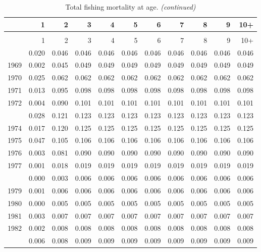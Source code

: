 \documentclass[
]{article}
\begin{document}
\begin{longtable}[t]{lrrrrrrrrrr}
\caption{\label{tab:FAA-tot-table}Total fishing mortality at age.}\\
\toprule
  & 1 & 2 & 3 & 4 & 5 & 6 & 7 & 8 & 9 & 10+\\
\midrule
\endfirsthead
\caption[]{Total fishing mortality at age. \textit{(continued)}}\\
\toprule
  & 1 & 2 & 3 & 4 & 5 & 6 & 7 & 8 & 9 & 10+\\
\midrule
\endhead

\endfoot
\bottomrule
\endlastfoot
1968 & 0.020 & 0.046 & 0.046 & 0.046 & 0.046 & 0.046 & 0.046 & 0.046 & 0.046 & 0.046\\
1969 & 0.002 & 0.045 & 0.049 & 0.049 & 0.049 & 0.049 & 0.049 & 0.049 & 0.049 & 0.049\\
1970 & 0.025 & 0.062 & 0.062 & 0.062 & 0.062 & 0.062 & 0.062 & 0.062 & 0.062 & 0.062\\
1971 & 0.013 & 0.095 & 0.098 & 0.098 & 0.098 & 0.098 & 0.098 & 0.098 & 0.098 & 0.098\\
1972 & 0.004 & 0.090 & 0.101 & 0.101 & 0.101 & 0.101 & 0.101 & 0.101 & 0.101 & 0.101\\
\addlinespace
1973 & 0.028 & 0.121 & 0.123 & 0.123 & 0.123 & 0.123 & 0.123 & 0.123 & 0.123 & 0.123\\
1974 & 0.017 & 0.120 & 0.125 & 0.125 & 0.125 & 0.125 & 0.125 & 0.125 & 0.125 & 0.125\\
1975 & 0.047 & 0.105 & 0.106 & 0.106 & 0.106 & 0.106 & 0.106 & 0.106 & 0.106 & 0.106\\
1976 & 0.003 & 0.081 & 0.090 & 0.090 & 0.090 & 0.090 & 0.090 & 0.090 & 0.090 & 0.090\\
1977 & 0.001 & 0.018 & 0.019 & 0.019 & 0.019 & 0.019 & 0.019 & 0.019 & 0.019 & 0.019\\
\addlinespace
1978 & 0.000 & 0.003 & 0.006 & 0.006 & 0.006 & 0.006 & 0.006 & 0.006 & 0.006 & 0.006\\
1979 & 0.001 & 0.006 & 0.006 & 0.006 & 0.006 & 0.006 & 0.006 & 0.006 & 0.006 & 0.006\\
1980 & 0.000 & 0.005 & 0.005 & 0.005 & 0.005 & 0.005 & 0.005 & 0.005 & 0.005 & 0.005\\
1981 & 0.003 & 0.007 & 0.007 & 0.007 & 0.007 & 0.007 & 0.007 & 0.007 & 0.007 & 0.007\\
1982 & 0.002 & 0.008 & 0.008 & 0.008 & 0.008 & 0.008 & 0.008 & 0.008 & 0.008 & 0.008\\
\addlinespace
1983 & 0.006 & 0.008 & 0.009 & 0.009 & 0.009 & 0.009 & 0.009 & 0.009 & 0.009 & 0.009\\

\end{longtable}
\end{document}
